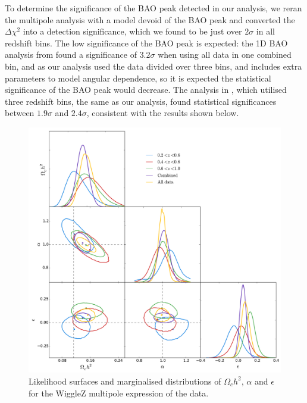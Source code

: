 \documentclass[iop,twocolappendix]{emulateapj}
\newcommand{\red}{\color{red}}
\begin{document}
To determine the significance of the BAO peak detected in our analysis, we reran the multipole analysis with a model devoid of the BAO peak and converted the $\Delta \chi^2$ into a detection significance, which we found to be just over $2\sigma$ in all redshift bins. The low significance of the BAO peak is expected: the 1D BAO analysis from \citet{BlakeDavis2011} found a significance of $3.2\sigma$ when using all data in one combined bin, and as our analysis used the data divided over three bins, and includes extra parameters to model angular dependence, so it is expected the statistical significance of the BAO peak would decrease. The analysis in \citet{BlakeKazin2011}, which utilised three redshift bins, the same as our analysis, found statistical significances between $1.9\sigma$ and $2.4\sigma$, consistent with the results shown below.


\begin{figure}
	\begin{center}
		\includegraphics[width=\columnwidth]{images/corCombinedMPWig.pdf}
	\end{center}
	\caption{Likelihood surfaces and marginalised distributions of $\Omega_ch^2$, $\alpha$ and $\epsilon$ for the WiggleZ multipole expression of the data. }
	\label{fig:wigglezBinsMP}
\end{figure}
\end{document}
